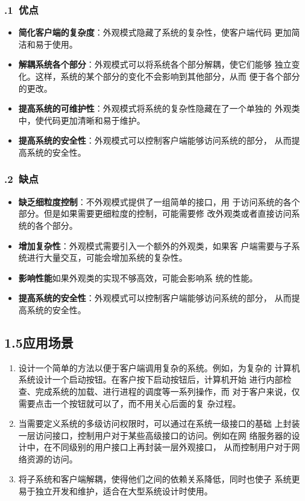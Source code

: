 \documentclass[24pt,a4paper]{article}%
\begin{document}
\subsubsection*{.1\ 优点}
\begin{itemize}
    \item \textbf{简化客户端的复杂度}：外观模式隐藏了系统的复杂性，使客户端代码
更加简洁和易于使用。
    \item \textbf{解耦系统各个部分}：外观模式可以将系统各个部分解耦，使它们能够
独立变化。这样，系统的某个部分的变化不会影响到其他部分，从而
便于各个部分的更改。
    \item \textbf{提高系统的可维护性}：外观模式将系统的复杂性隐藏在了一个单独的
外观类中，使代码更加清晰和易于维护。
    \item \textbf{提高系统的安全性}：外观模式可以控制客户端能够访问系统的部分，
从而提高系统的安全性。
\end{itemize}

\subsubsection*{.2\ 缺点}
\begin{itemize}
    \item \textbf{缺乏细粒度控制}：不外观模式提供了一组简单的接口，用
于访问系统的各个部分。但是如果需要更细粒度的控制，可能需要修
改外观类或者直接访问系统的各个部分。
    \item \textbf{增加复杂性}：外观模式需要引入一个额外的外观类，如果客
户端需要与子系统进行大量交互，可能会增加系统的复杂性。
    \item \textbf{影响性能}如果外观类的实现不够高效，可能会影响系
统的性能。
    \item \textbf{提高系统的安全性}：外观模式可以控制客户端能够访问系统的部分，
从而提高系统的安全性。
\end{itemize}

\subsection*{\songti 1.5应用场景}
\begin{enumerate}
    \item 设计一个简单的方法以便于客户端调用复杂的系统。例如，为复杂的
计算机系统设计一个启动按钮。在客户按下启动按钮后，计算机开始
进行内部检查、完成系统的加载、进行进程的调度等一系列操作，而
对于客户来说，仅需要点击一个按钮就可以了，而不用关心后面的复
杂过程。
    \item 当需要定义系统的多级访问权限时，可以通过在系统一级接口的基础
上封装一层访问接口，控制用户对于某些高级接口的访问。例如在网
络服务器的设计中，在不同级别的用户接口上再封装一层外观接口，
从而控制用户对于网络资源的访问。
    \item 将子系统和客户端解耦，使得他们之间的依赖关系降低，同时也使子
系统更易于独立开发和维护，适合在大型系统设计时使用。
\end{enumerate}
\end{document}
